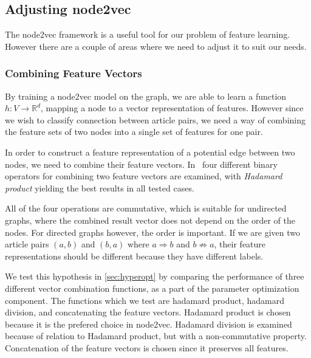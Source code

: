 \subsection{Adjusting node2vec}
The node2vec framework is a useful tool for our problem of feature learning. However there are a couple of areas where we need to adjust it to suit our needs.

\subsubsection{Combining Feature Vectors}\label{subsub:combining_feature_vectors}
By training a node2vec model on the graph, we are able to learn a function $h:V \to \mathbb{R}^d$, mapping a node to a vector representation of features. However since we wish to classify connection between article pairs, we need a way of combining the feature sets of two nodes into a single set of features for one pair.

In order to construct a feature representation of a potential edge between two nodes, we need to combine their feature vectors. In~\cite{node2vec} four different binary operators for combining two feature vectors are examined, with \emph{Hadamard product} yielding the best results in all tested cases.

All of the four operations are commutative, which is suitable for undirected graphs, where the combined result vector does not depend on the order of the nodes. For directed graphs however, the order is important. If we are given two article pairs $(a,b)$ and $(b,a)$ where $a \Rightarrow b$ and $b \not \Rightarrow a$, their feature representations should be different because they have different labels. 

We test this hypothesis in \cref{sec:hyperopt} by comparing the performance of three different vector combination functions, as a part of the parameter optimization component. The functions which we test are hadamard product, hadamard division, and concatenating the feature vectors. Hadamard product is chosen because it is the prefered choice in node2vec. Hadamard division is examined because of relation to Hadamard product, but with a non-commutative property. Concatenation of the feature vectors is chosen since it preserves all features.


